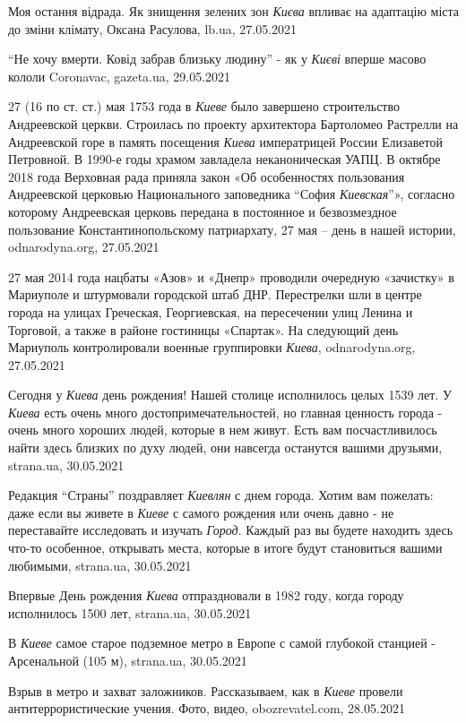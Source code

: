 Моя остання відрада. Як знищення зелених зон \emph{Києва} впливає на адаптацію міста
до зміни клімату, Оксана Расулова, lb.ua, 27.05.2021

\enquote{Не хочу вмерти. Ковід забрав близьку людину} - як у \emph{Києві}
вперше масово кололи Coronavac, gazeta.ua, 29.05.2021

27 (16 по ст. ст.) мая 1753 года в \emph{Киеве} было завершено строительство
Андреевской церкви. Строилась по проекту архитектора Бартоломео Растрелли на
Андреевской горе в память посещения \emph{Киева} императрицей России Елизаветой
Петровной. В 1990-е годы храмом завладела неканоническая УАПЦ. В октябре 2018
года Верховная рада приняла закон «Об особенностях пользования Андреевской
церковью Национального заповедника \enquote{София \emph{Киевская}}», согласно
которому Андреевская церковь передана в постоянное и безвозмездное пользование
Константинопольскому патриархату, 27 мая – день в нашей истории,
odnarodyna.org, 27.05.2021

27 мая 2014 года нацбаты «Азов» и «Днепр» проводили очередную «зачистку» в
Мариуполе и штурмовали городской штаб ДНР.  Перестрелки шли в центре города на
улицах Греческая, Георгиевская, на пересечении улиц Ленина и Торговой, а также
в районе гостиницы «Спартак». На следующий день Мариуполь контролировали
военные группировки \emph{Киева}, odnarodyna.org, 27.05.2021

Сегодня у \emph{Киева} день рождения! Нашей столице исполнилось целых 1539 лет.
У \emph{Киева} есть очень много достопримечательностей, но главная ценность
города - очень много хороших людей, которые в нем живут. Есть вам
посчастливилось найти здесь близких по духу людей, они навсегда останутся
вашими друзьями, strana.ua, 30.05.2021

Редакция \enquote{Страны} поздравляет \emph{Киевлян} с днем города. Хотим вам
пожелать: даже если вы живете в \emph{Киеве} с самого рождения или очень давно
- не переставайте исследовать и изучать \emph{Город}. Каждый раз вы будете находить
здесь что-то особенное, открывать места, которые в итоге будут становиться
вашими любимыми, strana.ua, 30.05.2021

Впервые День рождения \emph{Киева} отпраздновали в 1982 году, когда городу
исполнилось 1500 лет, strana.ua, 30.05.2021

В \emph{Киеве} самое старое подземное метро в Европе с самой глубокой станцией
- Арсенальной (105 м), strana.ua, 30.05.2021

Взрыв в метро и захват заложников. Рассказываем, как в \emph{Киеве} провели
антитеррористические учения. Фото, видео, obozrevatel.com, 28.05.2021

